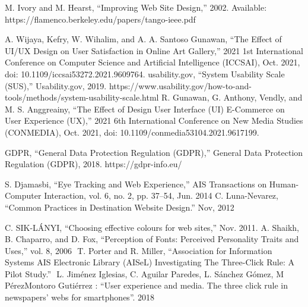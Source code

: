 \documentclass[article]{IEEEtran}
\begin{document}
\begin{thebibliography}{9}
                M. Ivory and M. Hearst, “Improving Web Site Design,” 2002. Available: https://flamenco.berkeley.edu/papers/tango-ieee.pdf
                
                A. Wijaya, Kefry, W. Wihalim, and A. A. Santoso Gunawan, “The Effect of UI/UX Design on User Satisfaction in Online Art Gallery,” 2021 1st International Conference on Computer Science and Artificial Intelligence (ICCSAI), Oct. 2021, doi: 10.1109/iccsai53272.2021.9609764.
                usability.gov, “System Usability Scale (SUS),” Usability.gov, 2019. https://www.usability.gov/how-to-and-tools/methods/system-usability-scale.html
                R. Gunawan, G. Anthony, Vendly, and M. S. Anggreainy, “The Effect of Design User Interface (UI) E-Commerce on User Experience (UX),” 2021 6th International Conference on New Media Studies (CONMEDIA), Oct. 2021, doi: 10.1109/conmedia53104.2021.9617199.

                GDPR, “General Data Protection Regulation (GDPR),” General Data Protection Regulation (GDPR), 2018. https://gdpr-info.eu/

            S. Djamasbi, “Eye Tracking and Web Experience,” AIS Transactions on Human-Computer Interaction, vol. 6, no. 2, pp. 37–54, Jun. 2014
            C. Luna-Nevarez, “Common Practices in Destination Website Design.” Nov, 2012

            C. SIK-LÁNYI, “Choosing effective colours for web sites,” Nov. 2011.
            A. Shaikh, B. Chaparro, and D. Fox, “Perception of Fonts: Perceived Personality Traits and Uses,” vol. 8, 2006
        ‌
            T. Porter and R. Miller, “Association for Information Systems AIS Electronic Library (AISeL) Investigating The Three-Click Rule: A Pilot Study.”
‌       
            ‌L. Jiménez Iglesias,  C. Aguilar  Paredes,  L. Sánchez  Gómez,  M Pérez­Montoro  Gutiérrez :  “User experience  and  media.  The  three  click  rule  in  newspapers’  webs  for  smartphones”. 2018
    \end{thebibliography}
\end{document}
